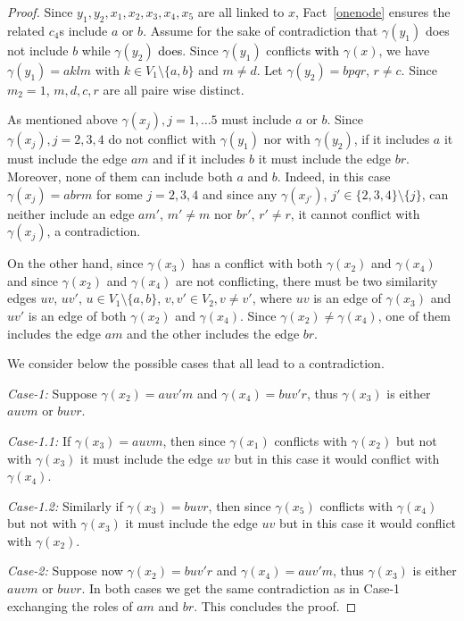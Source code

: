 \documentclass[final]{dmtcs-episciences}
\newcommand\mar[1]{\textcolor{black}{#1}}
\begin{document}
\begin{proof}
Since $y_1,y_2,x_1,x_2,x_3, x_4, x_5$ are all linked to $x$, Fact~\ref{onenode} ensures the related $c_4$s include  $a$ or $b$. 
Assume for the sake of contradiction that $\gamma(y_1)$ does not include $b$ while $\gamma(y_2)$  \mar{does}. Since $\gamma(y_1)$ conflicts \mar{with} $\gamma(x)$, we have  $\gamma(y_1)=aklm$ with $k \in V_1 \setminus \{a,b\}$ and $m\neq d$. Let  $\gamma(y_2)=bpqr$, $r\neq c$. Since $m_2=1$, $m, d,c,r$ are all paire wise distinct.

As mentioned above $\gamma(x_j), j=1,\ldots 5$ must include $a$ or $b$. Since $\gamma(x_j), j=2,3,4$ do not conflict with $\gamma(y_1)$ nor with $\gamma(y_2)$, if it includes $a$ it must include the edge $am$
and if it includes $b$ it must include the edge $br$. Moreover, none of them can include both $a$ and $b$. Indeed, in this case  
$\gamma(x_j)=abrm$ for some $j=2,3,4$ and since any $\gamma(x_{j'})$,  $j'\in \{2,3,4\}\setminus\{j\}$, can neither include an edge $am'$, $m'\neq m$ nor $br'$, $r'\neq r$, it cannot conflict with $\gamma(x_j)$, a contradiction.

On the other hand, since $\gamma(x_3)$ has a conflict with both $\gamma(x_2)$ and $\gamma(x_4)$ and since  $\gamma(x_2)$ and $\gamma(x_4)$ are not conflicting, there must be two similarity edges $uv$, $uv'$, $u\in V_1\setminus\{a,b\}$, $v,v'\in V_2, v\neq v'$, where $uv$ is an edge of $\gamma(x_3)$ and $uv'$ is an edge of both $\gamma(x_2)$ and $\gamma(x_4)$. Since $\gamma(x_2)\neq \gamma(x_4)$, one of them includes the edge $am$ and the other includes the edge $br$.

We consider below the possible cases that all lead to a contradiction.

 \emph{Case-1:}
Suppose $\gamma(x_2)=auv'm$ and $\gamma(x_4)=buv'r$, thus   
$\gamma(x_3)$ is either $auvm$ or $buvr$. 

  \emph{Case-1.1:} If $\gamma(x_3)=auvm$, then since $\gamma(x_1)$ conflicts with $\gamma(x_2)$ but not with $\gamma(x_3)$ it must include the edge $uv$ but in this case it would conflict with $\gamma(x_4)$.
 
  \emph{Case-1.2:} Similarly if $\gamma(x_3)=buvr$, then since $\gamma(x_5)$ conflicts with $\gamma(x_4)$ but not with $\gamma(x_3)$ it must include the edge $uv$ but in this case it would conflict with $\gamma(x_2)$.

  \emph{Case-2:}
Suppose now  $\gamma(x_2)=buv'r$ and $\gamma(x_4)=auv'm$, thus   
$\gamma(x_3)$ is either $auvm$ or $buvr$.
In both cases we get the same contradiction as in Case-1 exchanging the roles of $am$ and $br$. This concludes the proof.
\end{proof}
\end{document}
